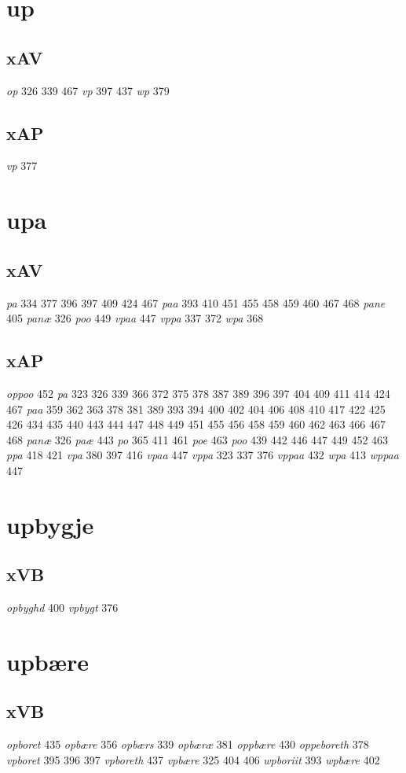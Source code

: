 \documentclass[a4paper,twocolumn]{article}
\begin{document}
\section{up}
\label{sec:orga321693}
\subsection{xAV}
\label{sec:orgc838e2e}
\emph{op} 326 339 467 \emph{vp} 397 437 \emph{wp} 379 
\subsection{xAP}
\label{sec:org7eae6b3}
\emph{vp} 377 
\section{upa}
\label{sec:org9f5634d}
\subsection{xAV}
\label{sec:org52a44c1}
\emph{pa} 334 377 396 397 409 424 467 \emph{paa} 393 410 451 455 458 459 460 467 468 \emph{pane} 405 \emph{panæ} 326 \emph{poo} 449 \emph{vpaa} 447 \emph{vppa} 337 372 \emph{wpa} 368 
\subsection{xAP}
\label{sec:org6632b03}
\emph{oppoo} 452 \emph{pa} 323 326 339 366 372 375 378 387 389 396 397 404 409 411 414 424 467 \emph{paa} 359 362 363 378 381 389 393 394 400 402 404 406 408 410 417 422 425 426 434 435 440 443 444 447 448 449 451 455 456 458 459 460 462 463 466 467 468 \emph{panæ} 326 \emph{paæ} 443 \emph{po} 365 411 461 \emph{poe} 463 \emph{poo} 439 442 446 447 449 452 463 \emph{ppa} 418 421 \emph{vpa} 380 397 416 \emph{vpaa} 447 \emph{vppa} 323 337 376 \emph{vppaa} 432 \emph{wpa} 413 \emph{wppaa} 447 
\section{upbygje}
\label{sec:org0b9e262}
\subsection{xVB}
\label{sec:org6722eda}
\emph{opbyghd} 400 \emph{vpbygt} 376 
\section{upbære}
\label{sec:orgb2864a0}
\subsection{xVB}
\label{sec:org90a1d55}
\emph{opboret} 435 \emph{opbære} 356 \emph{opbærs} 339 \emph{opbæræ} 381 \emph{oppbære} 430 \emph{oppeboreth} 378 \emph{vpboret} 395 396 397 \emph{vpboreth} 437 \emph{vpbære} 325 404 406 \emph{wpboriit} 393 \emph{wpbære} 402 
\end{document}
